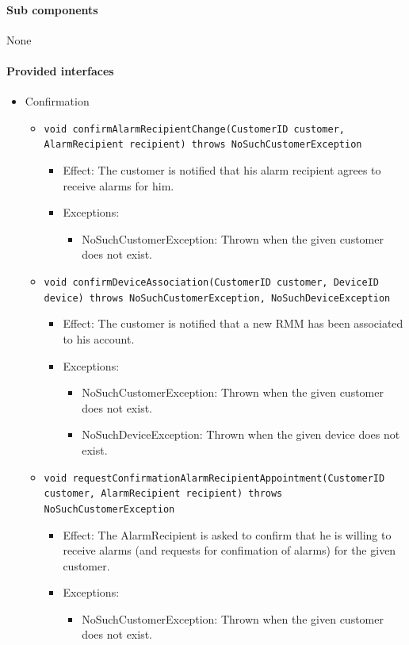 \documentclass[a4paper,10pt]{article}
\begin{document}
\paragraph{Sub components} None

\paragraph{Provided interfaces}
\begin{itemize}
    \item Confirmation
    \begin{itemize}
    	\item \texttt{void confirmAlarmRecipientChange(CustomerID customer, AlarmRecipient recipient) throws NoSuchCustomerException}
        \begin{itemize}
            \item Effect: The customer is notified that his alarm recipient agrees to receive alarms for him.
            \item Exceptions:  
            \begin{itemize}
                \item NoSuchCustomerException: Thrown when the given customer does not exist.
            \end{itemize}
        \end{itemize}
        
        \item \texttt{void confirmDeviceAssociation(CustomerID customer, DeviceID device) throws NoSuchCustomerException, NoSuchDeviceException}
        \begin{itemize}
            \item Effect: The customer is notified that a new RMM has been associated to his account.
            \item Exceptions:  
            \begin{itemize}
                \item NoSuchCustomerException: Thrown when the given customer does not exist.
                \item NoSuchDeviceException: Thrown when the given device does not exist.
            \end{itemize}
        \end{itemize}
        
    	\item \texttt{void requestConfirmationAlarmRecipientAppointment(CustomerID customer, AlarmRecipient recipient) throws NoSuchCustomerException}
        \begin{itemize}
            \item Effect: The AlarmRecipient is asked to confirm that he is willing to receive alarms (and requests for confimation of alarms) for the given customer.
            \item Exceptions:  
            \begin{itemize}
                \item NoSuchCustomerException: Thrown when the given customer does not exist.
            \end{itemize}
        \end{itemize}
        

\end{itemize}
\end{itemize}
\end{document}

